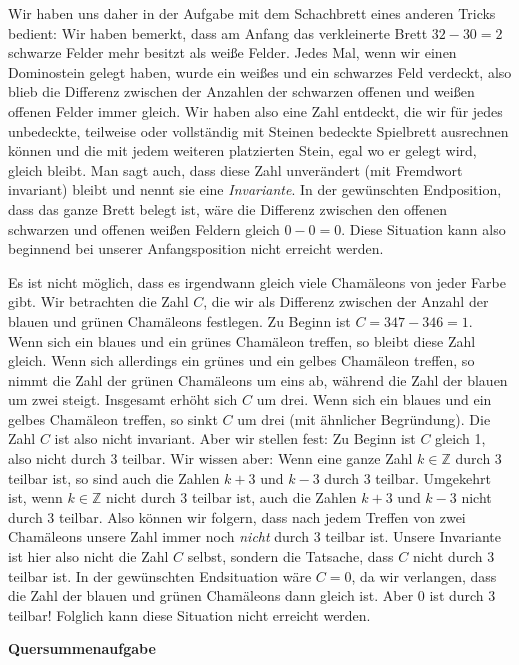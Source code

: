 \documentclass[a4paper,ngerman,12pt]{scrartcl}
\newcommand{\ZZ}{\mathbb{Z}}
\theoremstyle{definition}
\theoremstyle{plain}
\theoremstyle{remark}
\begin{document}
Wir haben uns daher in der Aufgabe mit dem Schachbrett eines anderen Tricks bedient: Wir haben bemerkt, dass am Anfang das verkleinerte Brett $32 - 30 = 2$ schwarze Felder mehr besitzt als weiße Felder. Jedes Mal, wenn wir einen Dominostein gelegt haben, wurde ein weißes und ein schwarzes Feld verdeckt, also blieb die Differenz zwischen der Anzahlen der schwarzen offenen und weißen offenen Felder immer gleich. Wir haben also eine Zahl entdeckt, die wir für jedes unbedeckte, teilweise oder vollständig mit Steinen bedeckte Spielbrett ausrechnen können und die mit jedem weiteren platzierten Stein, egal wo er gelegt wird, gleich bleibt. Man sagt auch, dass diese Zahl unverändert (mit Fremdwort invariant) bleibt und nennt sie eine \emph{Invariante}. In der gewünschten Endposition, dass das ganze Brett belegt ist, wäre die Differenz zwischen den offenen schwarzen und offenen weißen Feldern gleich $0 - 0 = 0$. Diese Situation kann also beginnend bei unserer Anfangsposition nicht erreicht werden.

Es ist nicht möglich, dass es irgendwann gleich viele Chamäleons von jeder Farbe gibt. Wir betrachten die Zahl $C$, die wir als Differenz zwischen der Anzahl der blauen und grünen Chamäleons festlegen. Zu Beginn ist $C = 347 - 346 = 1$. Wenn sich ein blaues und ein grünes Chamäleon treffen, so bleibt diese Zahl gleich. Wenn sich allerdings ein grünes und ein gelbes Chamäleon treffen, so nimmt die Zahl der grünen Chamäleons um eins ab, während die Zahl der blauen um zwei steigt. Insgesamt erhöht sich $C$ um drei. Wenn sich ein blaues und ein gelbes Chamäleon treffen, so sinkt $C$ um drei (mit ähnlicher Begründung). Die Zahl $C$ ist also nicht invariant. Aber wir stellen fest: Zu Beginn ist $C$ gleich 1, also nicht durch 3 teilbar. Wir wissen aber: Wenn eine ganze Zahl $k \in \ZZ$ durch 3 teilbar ist, so sind auch die Zahlen $k + 3$ und $k - 3$ durch 3 teilbar. Umgekehrt ist, wenn $k \in \ZZ$ nicht durch 3 teilbar ist, auch die Zahlen $k + 3$ und $k - 3$ nicht durch 3 teilbar. Also können wir folgern, dass nach jedem Treffen von zwei Chamäleons unsere Zahl immer noch \emph{nicht} durch 3 teilbar ist. Unsere Invariante ist hier also nicht die Zahl $C$ selbst, sondern die Tatsache, dass $C$ nicht durch 3 teilbar ist. In der gewünschten Endsituation wäre $C = 0$, da wir verlangen, dass die Zahl der blauen und grünen Chamäleons dann gleich ist. Aber 0 ist durch 3 teilbar! Folglich kann diese Situation nicht erreicht werden.

\textbf{Quersummenaufgabe}
\end{document}
